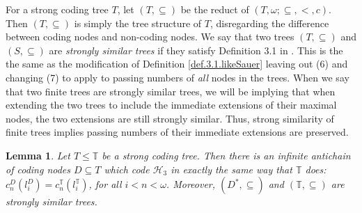 \documentclass{amsart}
\newtheorem{lem}[thm]{Lemma}
\theoremstyle{remark}
\theoremstyle{definition}
\theoremstyle{remark}
\newcommand{\om}{\omega}
\newcommand{\sse}{\subseteq}
\newcommand{\bT}{\mathbb{T}}
\begin{document}
For a strong coding tree $T$,  let $(T,\sse)$
be the reduct of $(T,\om;\sse,<,c)$.
Then  $(T,\sse)$
is simply the tree structure of $T$, disregarding the difference between coding nodes and non-coding nodes.
We say that two trees $(T,\sse)$ and $(S,\sse)$ are {\em strongly similar trees}
if they
 satisfy
Definition 3.1 in  \cite{Sauer06}.
This is the  the same as the
modification of Definition \ref{def.3.1.likeSauer}
leaving out (6) and changing (7) to apply to passing numbers of  {\em all} nodes in the trees.
When we say that two finite trees are strongly similar trees, we will be implying that
when
 extending the two trees to include the  immediate extensions of their maximal nodes, the two extensions are still strongly similar.
Thus, strong similarity of finite trees implies passing numbers of  their immediate extensions are preserved.





\begin{lem}\label{lem.bD}
Let $T\le \bT$ be a strong coding tree.
Then there is an infinite  antichain of coding nodes  $D\sse T$  which code
 $\mathcal{H}_3$ in exactly the same way that $\bT$ does:
$c^{D}_n(l^{D}_i)=c^{\bT}_n(l^{\bT}_i)$,
for all $i<n<\om$.
Moreover,
$(D^*,\sse)$  and $(\bT,\sse)$ are strongly similar trees.
\end{lem}
\end{document}
